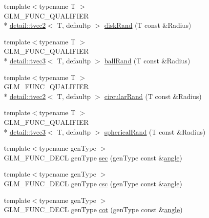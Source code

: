 \begin{DoxyCompactItemize}
\item 
{\footnotesize template$<$typename T $>$ }\\G\-L\-M\-\_\-\-F\-U\-N\-C\-\_\-\-Q\-U\-A\-L\-I\-F\-I\-E\-R \\*
\hyperlink{structglm_1_1detail_1_1tvec2}{detail\-::tvec2}$<$ T, defaultp $>$ \hyperlink{group__gtc__random_ga7d24fc3ef13fd7b6cad7e7b870b0e322}{disk\-Rand} (T const \&Radius)
\item 
{\footnotesize template$<$typename T $>$ }\\G\-L\-M\-\_\-\-F\-U\-N\-C\-\_\-\-Q\-U\-A\-L\-I\-F\-I\-E\-R \\*
\hyperlink{structglm_1_1detail_1_1tvec3}{detail\-::tvec3}$<$ T, defaultp $>$ \hyperlink{group__gtc__random_gac9c6e44b013874c291547f568d240500}{ball\-Rand} (T const \&Radius)
\item 
{\footnotesize template$<$typename T $>$ }\\G\-L\-M\-\_\-\-F\-U\-N\-C\-\_\-\-Q\-U\-A\-L\-I\-F\-I\-E\-R \\*
\hyperlink{structglm_1_1detail_1_1tvec2}{detail\-::tvec2}$<$ T, defaultp $>$ \hyperlink{group__gtc__random_gac1ab03c2c797ce352fd74cdb5229b151}{circular\-Rand} (T const \&Radius)
\item 
{\footnotesize template$<$typename T $>$ }\\G\-L\-M\-\_\-\-F\-U\-N\-C\-\_\-\-Q\-U\-A\-L\-I\-F\-I\-E\-R \\*
\hyperlink{structglm_1_1detail_1_1tvec3}{detail\-::tvec3}$<$ T, defaultp $>$ \hyperlink{group__gtc__random_ga8a9eee1fcb08690881ead242fe4259dc}{spherical\-Rand} (T const \&Radius)
\item 
{\footnotesize template$<$typename gen\-Type $>$ }\\G\-L\-M\-\_\-\-F\-U\-N\-C\-\_\-\-D\-E\-C\-L gen\-Type \hyperlink{group__gtc__reciprocal_gabb6829a472da1cc94d88afa6396bed1f}{sec} (gen\-Type const \&\hyperlink{group__gtc__quaternion_ga23a3fc7ada5bbb665ff84c92c6e0542c}{angle})
\item 
{\footnotesize template$<$typename gen\-Type $>$ }\\G\-L\-M\-\_\-\-F\-U\-N\-C\-\_\-\-D\-E\-C\-L gen\-Type \hyperlink{group__gtc__reciprocal_ga5df75de99f63e854087a06f538907b2c}{csc} (gen\-Type const \&\hyperlink{group__gtc__quaternion_ga23a3fc7ada5bbb665ff84c92c6e0542c}{angle})
\item 
{\footnotesize template$<$typename gen\-Type $>$ }\\G\-L\-M\-\_\-\-F\-U\-N\-C\-\_\-\-D\-E\-C\-L gen\-Type \hyperlink{group__gtc__reciprocal_ga2f49e28c2634ae1a212e2fc38c42ad42}{cot} (gen\-Type const \&\hyperlink{group__gtc__quaternion_ga23a3fc7ada5bbb665ff84c92c6e0542c}{angle})

\end{DoxyCompactItemize}
